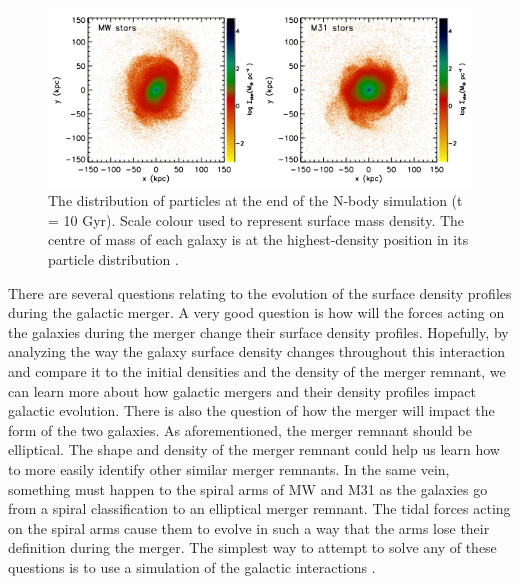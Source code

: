 \documentclass[linenumbers,trackchanges]{aastex7}
\begin{document}
\begin{figure}[h!]
\centering
\includegraphics[scale=0.85]{van_der_Marel_et_al_Figure.png}
\caption{The distribution of particles at the end of the N-body simulation (t = 10 Gyr). Scale colour used to represent surface mass density. The centre of mass of each galaxy is at the highest-density position in its particle distribution \citep{van_der_Marel_Besla_Cox_Sohn_Anderson_2012}.
\label{fig:general}}
\end{figure}

There are several questions relating to the evolution of the surface
density profiles during the galactic merger. A very good question is
how will the forces acting on the galaxies during the merger change
their surface density profiles. Hopefully, by analyzing the way the
galaxy surface density changes throughout this interaction and compare
it to the initial densities and the density of the merger remnant, we
can learn more about how galactic mergers and their density profiles
impact galactic evolution. There is also the question of how the
merger will impact the form of the two galaxies. As
aforementioned, the merger remnant should be elliptical. The shape and
density of the merger remnant could help us learn how to more easily
identify other similar merger remnants. In the same vein, something
must happen to the spiral arms of MW and M31 as the galaxies go from a
spiral classification to an elliptical merger remnant. The tidal
forces acting on the spiral arms cause them to evolve in such a way
that the arms lose their definition during the merger. The simplest
way to attempt to solve any of these questions is to use a simulation
of the galactic interactions
\citep{van_der_Marel_Besla_Cox_Sohn_Anderson_2012}.
\end{document}
